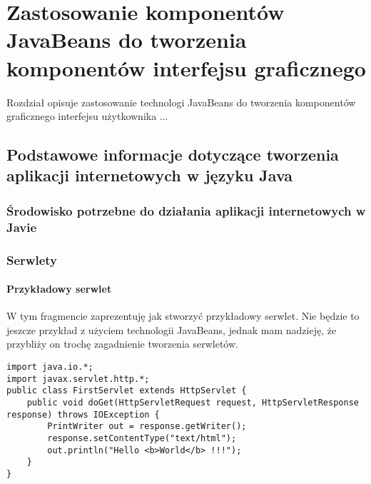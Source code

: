 \chapter{Zastosowanie komponentów JavaBeans do tworzenia komponentów interfejsu graficznego}
Rozdział opisuje zastosowanie technologi JavaBeans do tworzenia komponentów
graficznego interfejsu użytkownika ...


\section{Podstawowe informacje dotyczące tworzenia aplikacji internetowych w języku Java}

\subsection{Środowisko potrzebne do działania aplikacji internetowych w Javie}

\subsection{Serwlety}

\subsubsection{Przykładowy serwlet}

W tym fragmencie zaprezentuję jak stworzyć przykładowy serwlet. Nie będzie to jeszcze przykład z użyciem technologii JavaBeans, jednak mam nadzieję, że przybliży on trochę zagadnienie tworzenia serwletów.

\begin{lstlisting}[caption={[Przykładowy serwlet]Przykładowy serwlet}]
import java.io.*;
import javax.servlet.http.*;
public class FirstServlet extends HttpServlet {
	public void doGet(HttpServletRequest request, HttpServletResponse response) throws IOException {
		PrintWriter out = response.getWriter();
		response.setContentType("text/html");
		out.println("Hello <b>World</b> !!!");
	}
}
\end{lstlisting}